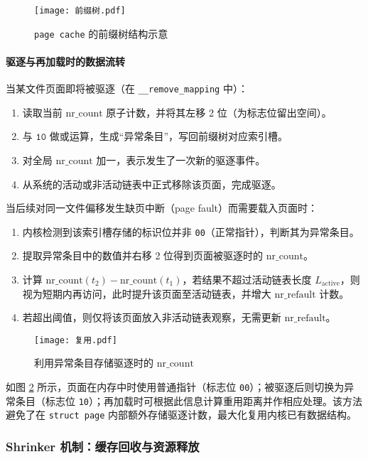 \begin{figure}[htbp]
  \centering
  \texttt{[image: 前缀树.pdf]}
  \caption{\texttt{page cache} 的前缀树结构示意}
  \label{fig:前缀树}
\end{figure}

\paragraph{驱逐与再加载时的数据流转}
当某文件页面即将被驱逐（在 \texttt{\_\_remove\_mapping} 中）：
\begin{enumerate}
  \item 读取当前 \(\mathrm{nr\_count}\) 原子计数，并将其左移 2 位（为标志位留出空间）。
  \item 与 \(\texttt{10}\) 做或运算，生成“异常条目”，写回前缀树对应索引槽。
  \item 对全局 \(\mathrm{nr\_count}\) 加一，表示发生了一次新的驱逐事件。
  \item 从系统的活动或非活动链表中正式移除该页面，完成驱逐。
\end{enumerate}

当后续对同一文件偏移发生缺页中断（page fault）而需要载入页面时：
\begin{enumerate}
  \item 内核检测到该索引槽存储的标识位并非 \texttt{00}（正常指针），判断其为异常条目。
  \item 提取异常条目中的数值并右移 2 位得到页面被驱逐时的 \(\mathrm{nr\_count}\)。
  \item 计算 \(\mathrm{nr\_count}(t_2) - \mathrm{nr\_count}(t_1)\)，若结果不超过活动链表长度 \(L_{\mathrm{active}}\)，则视为短期内再访问，此时提升该页面至活动链表，并增大 \(\mathrm{nr\_refault}\) 计数。
  \item 若超出阈值，则仅将该页面放入非活动链表观察，无需更新 \(\mathrm{nr\_refault}\)。
\end{enumerate}

\begin{figure}[htbp]
  \centering
  \texttt{[image: 复用.pdf]}
  \caption{利用异常条目存储驱逐时的 \(\mathrm{nr\_count}\)}
  \label{fig:复用}
\end{figure}

如图 \ref{fig:复用} 所示，页面在内存中时使用普通指针（标志位 \texttt{00}）；被驱逐后则切换为异常条目（标志位 \texttt{10}）；再加载时可根据此信息计算重用距离并作相应处理。该方法避免了在 \texttt{struct page} 内部额外存储驱逐计数，最大化复用内核已有数据结构。

\subsubsection{Shrinker 机制：缓存回收与资源释放}

